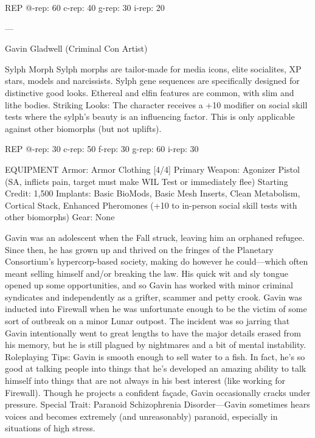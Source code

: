 ﻿%

   REP
   @-rep:	60
   c-rep:	40
   g-rep:	30
   i-rep:	20

---

Gavin Gladwell (Criminal Con Artist)

Sylph Morph
Sylph morphs are tailor-made for media icons, elite socialites, XP stars, models and narcissists. Sylph gene sequences are specifically designed for distinctive good looks. Ethereal and elfin features are common, with slim and lithe bodies.
Striking Looks: The character receives a +10 modifier on social skill tests where the sylph's beauty is an influencing factor. This is only applicable against other biomorphs (but not uplifts).

REP
@-rep:	30
c-rep:	50
f-rep:	30
g-rep:	60
i-rep:	30

EQUIPMENT
Armor: Armor Clothing [4/4]
Primary Weapon: Agonizer Pistol (SA, inflicts pain, target must make WIL Test or immediately flee)
Starting Credit: 1,500
Implants: Basic BioMods, Basic Mesh Inserts, Clean Metabolism, Cortical Stack, Enhanced Pheromones (+10 to in-person social skill tests with other biomorphs)
Gear: None


Gavin was an adolescent when the Fall struck, leaving him an orphaned refugee. Since then, he has grown up and thrived on the fringes of the Planetary Consortium’s hypercorp-based society, making do however he could—which often meant selling himself and/or breaking the law. His quick wit and sly tongue opened up some opportunities, and so Gavin has worked with minor criminal syndicates and independently as a grifter, scammer and petty crook. Gavin was inducted into Firewall when he was unfortunate enough to be the victim of some sort of outbreak on a minor Lunar outpost. The incident was so jarring that Gavin intentionally went to great lengths to have the major details erased from his memory, but he is still plagued by nightmares and a bit of mental instability.
Roleplaying Tips: Gavin is smooth enough to sell water to a fish. In fact, he’s so good at talking people into things that he’s developed an amazing ability to talk himself into things that are not always in his best interest (like working for Firewall). Though he projects a confident façade, Gavin occasionally cracks under pressure.
Special Trait: Paranoid Schizophrenia Disorder—Gavin sometimes hears voices and becomes extremely (and unreasonably) paranoid, especially in situations of high stress.

